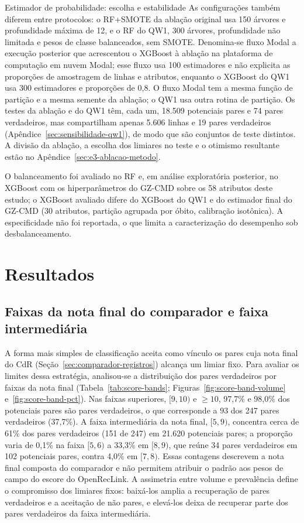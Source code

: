 \begin{chapter}{Estimador de probabilidade: escolha e estabilidade}
As configurações também diferem entre protocolos: o RF+SMOTE da ablação original usa 150 árvores e profundidade máxima de 12, e o RF do QW1, 300 árvores, profundidade não limitada e pesos de classe balanceados, sem SMOTE. Denomina-se fluxo Modal a execução posterior que acrescentou o XGBoost à ablação na plataforma de computação em nuvem Modal; esse fluxo usa 100 estimadores e não explicita as proporções de amostragem de linhas e atributos, enquanto o XGBoost do QW1 usa 300 estimadores e proporções de 0,8. O fluxo Modal tem a mesma função de partição e a mesma semente da ablação; o QW1 usa outra rotina de partição. Os testes da ablação e do QW1 têm, cada um, 18.509 potenciais pares e 74 pares verdadeiros, mas compartilham apenas 5.606 linhas e 19 pares verdadeiros (Apêndice~\ref{sec:sensibilidade-qw1}), de modo que são conjuntos de teste distintos. A divisão da ablação, a escolha dos limiares no teste e o otimismo resultante estão no Apêndice~\ref{sec:e3-ablacao-metodo}.

O balanceamento foi avaliado no RF e, em análise exploratória posterior, no XGBoost com os hiperparâmetros do GZ-CMD sobre os 58 atributos deste estudo; o XGBoost avaliado difere do XGBoost do QW1 e do estimador final do GZ-CMD (30 atributos, partição agrupada por óbito, calibração isotônica). A especificidade não foi reportada, o que limita a caracterização do desempenho sob desbalanceamento.

\section{Resultados}\label{sec:e2-resultados}

\subsection{Faixas da nota final do comparador e faixa intermediária}\label{sec:e2-faixas-escore}

A forma mais simples de classificação aceita como vínculo os pares cuja nota final do CdR (Seção~\ref{sec:comparador-registros}) alcança um limiar fixo. Para avaliar os limites dessa estratégia, analisou-se a distribuição dos pares verdadeiros por faixas da nota final (Tabela~\ref{tab:score-bands}; Figuras~\ref{fig:score-band-volume} e~\ref{fig:score-band-pct}). Nas faixas superiores, $[9,10)$ e $\geq10$, 97,7\% e 98,0\% dos potenciais pares são pares verdadeiros, o que corresponde a 93 dos 247 pares verdadeiros (37,7\%). A faixa intermediária da nota final, $[5,9)$, concentra cerca de 61\% dos pares verdadeiros (151 de 247) em 21.620 potenciais pares; a proporção varia de 0,1\% na faixa $[5,6)$ a 33,3\% em $[8,9)$, que reúne 34 pares verdadeiros em 102 potenciais pares, contra 4,0\% em $[7,8)$. Essas contagens descrevem a nota final composta do comparador e não permitem atribuir o padrão aos pesos de campo do escore do OpenRecLink. A assimetria entre volume e prevalência define o compromisso dos limiares fixos: baixá-los amplia a recuperação de pares verdadeiros e a aceitação de não pares, e elevá-los deixa de recuperar parte dos pares verdadeiros da faixa intermediária.


\end{chapter}
